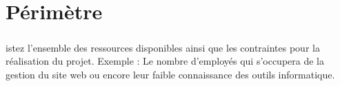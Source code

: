 \chapter{Périmètre}
\paragraph{}
istez l’ensemble des ressources disponibles ainsi que les contraintes pour la réalisation du projet. Exemple : Le nombre d’employés qui s’occupera de la gestion du site web ou encore leur faible connaissance des outils informatique.